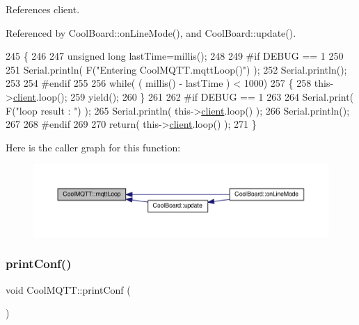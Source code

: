 References client.



Referenced by Cool\+Board\+::on\+Line\+Mode(), and Cool\+Board\+::update().


\begin{DoxyCode}
245 \{
246 
247     \textcolor{keywordtype}{unsigned} \textcolor{keywordtype}{long} lastTime=millis();
248 
249 \textcolor{preprocessor}{#if DEBUG == 1}
250 
251     Serial.println( F(\textcolor{stringliteral}{"Entering CoolMQTT.mqttLoop()"}) );
252     Serial.println();
253 
254 \textcolor{preprocessor}{#endif  }
255 
256     \textcolor{keywordflow}{while}( ( millis() - lastTime ) < 1000)
257     \{
258         this->\hyperlink{classCoolMQTT_a4ca71e4f76ef868692a297efd45b1415}{client}.loop();
259         yield();
260     \}
261 
262 \textcolor{preprocessor}{#if DEBUG == 1 }
263     
264     Serial.print( F(\textcolor{stringliteral}{"loop result : "}) );
265     Serial.println( this->\hyperlink{classCoolMQTT_a4ca71e4f76ef868692a297efd45b1415}{client}.loop() );
266     Serial.println();
267 
268 \textcolor{preprocessor}{#endif}
269 
270     \textcolor{keywordflow}{return}( this->\hyperlink{classCoolMQTT_a4ca71e4f76ef868692a297efd45b1415}{client}.loop() );
271 \}
\end{DoxyCode}
Here is the caller graph for this function\+:
\nopagebreak
\begin{figure}[H]
\begin{center}
\leavevmode
\includegraphics[width=350pt]{classCoolMQTT_aa5eaae967b562b62cbcf2b8d81f6e5d5_icgraph}
\end{center}
\end{figure}
\mbox{\label{classCoolMQTT_a40553a0ad4b5ecf1cb4411ab54ca85fb}} 
\subsubsection{\texorpdfstring{print\+Conf()}{printConf()}}
{\footnotesize\ttfamily void Cool\+M\+Q\+T\+T\+::print\+Conf (\begin{DoxyParamCaption}{ }\end{DoxyParamCaption})}

